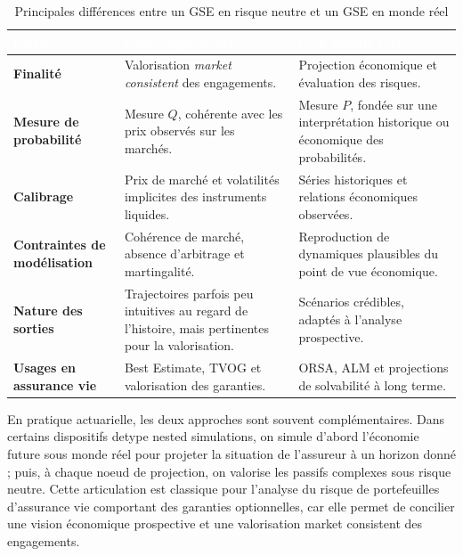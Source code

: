 \begin{table}[H]
    \centering
    \renewcommand{\arraystretch}{1.4}
    \begin{tabularx}{\textwidth}{>{\raggedright\arraybackslash}p{} >{\raggedright\arraybackslash}X >{\raggedright\arraybackslash}X}
        \rowcolor{accenture}
        \textcolor{white}{\textbf{Critère}} & \textcolor{white}{\textbf{GSE risque neutre}} & \textcolor{white}{\textbf{GSE monde réel}} \\
        \toprule
        \textbf{Finalité} & Valorisation \textit{market consistent} des engagements. & Projection économique et évaluation des risques. \\
        \rowcolor{coulCash}
        \textbf{Mesure de probabilité} & Mesure $Q$, cohérente avec les prix observés sur les marchés. & Mesure $P$, fondée sur une interprétation historique ou économique des probabilités. \\
        \textbf{Calibrage} & Prix de marché et volatilités implicites des instruments liquides. & Séries historiques et relations économiques observées. \\
        \rowcolor{coulCash}
        \textbf{Contraintes de modélisation} & Cohérence de marché, absence d'arbitrage et martingalité. & Reproduction de dynamiques plausibles du point de vue économique. \\
        \textbf{Nature des sorties} & Trajectoires parfois peu intuitives au regard de l'histoire, mais pertinentes pour la valorisation. & Scénarios crédibles, adaptés à l'analyse prospective. \\
        \rowcolor{coulCash}
        \textbf{Usages en assurance vie} & Best Estimate, TVOG et valorisation des garanties. & ORSA, ALM et projections de solvabilité à long terme. \\
        \bottomrule
    \end{tabularx}
    \caption{Principales différences entre un GSE en risque neutre et un GSE en monde réel}
    \label{tab:comparaison_gse}
\end{table}

En pratique actuarielle, les deux approches sont souvent complémentaires. Dans certains dispositifs detype nested simulations, on simule d'abord l'économie future sous monde réel pour projeter la situation de l'assureur à un horizon donné ; puis, à chaque noeud de projection, on valorise les passifs complexes sous risque neutre. Cette articulation est classique pour l'analyse du risque de portefeuilles d'assurance vie comportant des garanties optionnelles, car elle permet de concilier une vision économique prospective et une valorisation market consistent des engagements.

